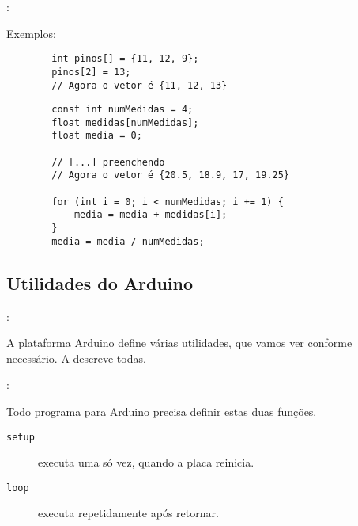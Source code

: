\begin{frame}[fragile]{\insertsection: \insertsubsection}

	Exemplos:
	\begin{verbatim}
		int pinos[] = {11, 12, 9};
		pinos[2] = 13;
		// Agora o vetor é {11, 12, 13}
	\end{verbatim}

	\begin{verbatim}
		const int numMedidas = 4;
		float medidas[numMedidas];
		float media = 0;

		// [...] preenchendo
		// Agora o vetor é {20.5, 18.9, 17, 19.25}

		for (int i = 0; i < numMedidas; i += 1) {
			media = media + medidas[i];
		}
		media = media / numMedidas;
	\end{verbatim}

\end{frame}


\subsection{Utilidades do Arduino}


\begin{frame}{\insertsection: \insertsubsection}

	A plataforma Arduino define várias utilidades, que vamos ver conforme necessário. A  descreve todas.

\end{frame}


\begin{frame}[fragile]{\insertsection: \insertsubsection}

	Todo programa para Arduino precisa definir estas duas funções.


	\begin{description}
		\item[\texttt{setup}] executa uma só vez, quando a placa reinicia.
		\item[\texttt{loop}] executa repetidamente após \texttt{} retornar.
	\end{description}

\end{frame}


